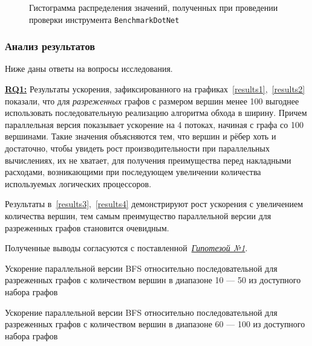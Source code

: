 \begin{figure}[ht]
  \centering

\caption{Гистограмма распределения значений, полученных при проведении проверки инструмента \texttt{BenchmarkDotNet}}
\label{histogram}
\end{figure}


\subsubsection*{Анализ результатов}
\noindent Ниже даны ответы на вопросы исследования.
\newline

\noindent\hyperref[rq1]{\textbf{RQ1:}}
Результаты ускорения, зафиксированного на графиках~\ref{results1},~\ref{results2} показали, что для \emph{разреженных} графов с размером вершин менее 100 выгоднее использовать последовательную реализацию алгоритма обхода в ширину. Причем параллельная версия показывает ускорение на 4 потоках, начиная с графа со 100 вершинами. Такие значения объясняются тем, что вершин и рёбер хоть и достаточно, чтобы увидеть рост производительности при параллельных вычислениях, их не хватает, для получения преимущества перед накладными расходами, возникающими при последующем увеличении количества используемых логических процессоров. 

Результаты в~\ref{results3},~\ref{results4} демонстрируют рост ускорения с увеличением количества вершин, тем самым преимущество параллельной версии для разреженных графов становится очевидным.

Полученные выводы согласуются с поставленной~\hyperref[t1]{\textit{Гипотезой №1}}.
\newline

\begin{table}
  \centering

\caption{Ускорение параллельной версии BFS относительно последовательной для разреженных графов с количеством вершин в диапазоне 10 --- 50 из доступного набора графов}
\label{results1}
\end{table}

\begin{table}
  \centering

\caption{Ускорение параллельной версии BFS относительно последовательной для разреженных графов с количеством вершин в диапазоне 60 --- 100 из доступного набора графов}
\label{results2}
\end{table}

